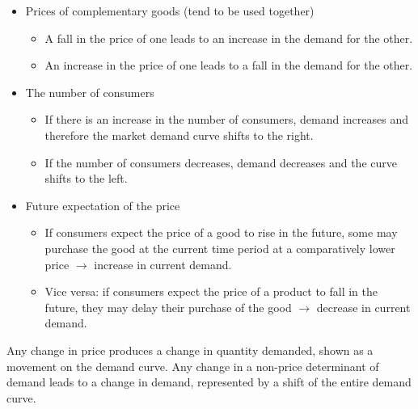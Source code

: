 \documentclass[a4paper,12pt]{article}
\begin{document}
\begin{itemize}
\begin{itemize}
    \item An increase in the price of one results in an increase in the demand for the other. (switching products)
  \end{itemize}
  \item Prices of complementary goods (tend to be used together)
  \begin{itemize}
    \item A fall in the price of one leads to an increase in the demand for the other.
    \item An increase in the price of one leads to a fall in the demand for the other.
  \end{itemize}
  \item The number of consumers
  \begin{itemize}
    \item If there is an increase in the number of consumers, demand increases and therefore the market demand curve shifts to the right.
    \item If the number of consumers decreases, demand decreases and the curve shifts to the left.
  \end{itemize}
  \item Future expectation of the price
	\begin{itemize}
\item If consumers expect the price of a good to rise in the future, some may purchase the good at the current time period at a comparatively lower price $\rightarrow$ increase in current demand.
\item Vice versa: if consumers expect the price of a product to fall in the future, they may delay their purchase of the good $\rightarrow$ decrease in current demand.
\end{itemize}
\end{itemize}
Any change in price produces a change in quantity demanded, shown as a movement on the demand curve. Any change in a non-price determinant
of demand leads to a change in demand, represented by a shift of the entire demand curve.
\end{document}

